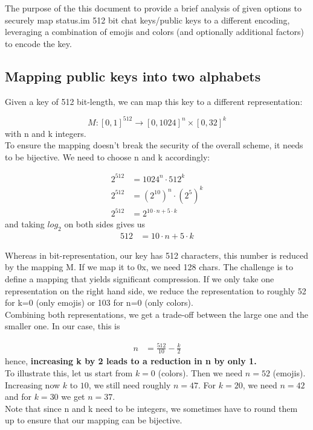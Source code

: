 \documentclass[a4paper,12pt]{article}
\begin{document}
The purpose of the this document to provide a brief analysis of given options to securely map status.im 512 bit chat keys/public keys to a different encoding, leveraging a combination of emojis and colors (and optionally additional factors) to encode the key.\\

\subsection*{Mapping public keys into two alphabets}
\noindent Given a key of 512 bit-length, we can map this key to a different representation:

\begin{equation}
    M: [0,1]^{512} \rightarrow [0,1024]^{n}  \times [0,32]^{k} 
\end{equation} 
with n and k integers.\\


\noindent To ensure the mapping doesn't break the security of the overall scheme, it needs to be bijective. We need to choose n and k accordingly:

\begin{align}
    2^{512} & = 1024^n \cdot 512^k \\
    2^{512} & = (2^{10})^n \cdot (2^5)^k \\
    2^{512} & = 2^{10 \cdot n + 5 \cdot k}
\end{align}
and taking $log_2$ on both sides gives us
\begin{align}
    512 & = 10 \cdot n + 5 \cdot k
\end{align}

\noindent Whereas in bit-representation, our key has 512 characters, this number is reduced by the mapping M. If we map it to 0x, we need 128 chars. The challenge is to define a mapping that yields significant compression. If we only take one representation on the right hand side, we reduce the representation to roughly 52 for k=0 (only emojis) or 103 for n=0 (only colors).\\


\noindent Combining both representations, we get a trade-off between the large one and the smaller one. In our case, this is

\begin{align}
    n & = \frac{512}{10} - \frac{k}{2}
\end{align}
hence, \textbf{increasing k by 2 leads to a reduction in n by only 1.}\\


\noindent To illustrate this, let us start from $k=0$ (colors). Then we need $n=52$ (emojis). Increasing now $k$ to $10$, we still need roughly $n=47$. For $k = 20$, we need $n = 42$ and for $k = 30$ we get $n = 37$.\\

\noindent Note that since n and k need to be integers, we sometimes have to round them up to ensure that our mapping can be bijective.
\end{document}

